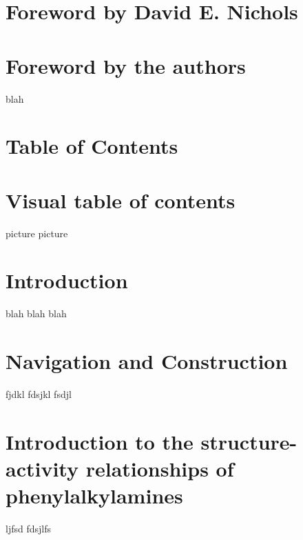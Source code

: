 
	\section{Foreword by David E. Nichols}
	
	\clearpage
	
	\section{Foreword by the authors}
	blah
	\clearpage
	
	\section{Table of Contents}
	
	\section{Visual table of contents}
	picture
	picture
	\clearpage
	
	\section{Introduction}
	blah blah blah
	\clearpage
	
	\section{Navigation and Construction}
	fjdkl
	fdsjkl
	fsdjl
	\clearpage
	
	\section{Introduction to the structure-activity relationships of phenylalkylamines}
	ljfsd
	fdsjlfs
